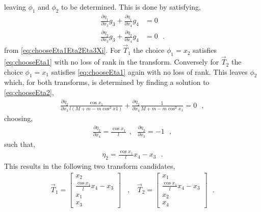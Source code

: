 leaving $\phi_1$ and $\phi_2$ to be determined. This is done by satisfying,
\begin{align}
\frac{\partial \eta_1}{\partial x_3} g_3 + \frac{\partial \eta_1}{\partial x_4} g_4 &= 0       \label{eq:chooseEta1}  \\
\frac{\partial \eta_2}{\partial x_3} g_3 + \frac{\partial \eta_2}{\partial x_4} g_4 &= 0       \label{eq:chooseEta2}  
\ \ \ .
\end{align}
from \autoref{eq:chooseEta1Eta2Eta3Xi}. For $\vec{T}_1$ the choice $\phi_1 = x_2$ satisfies \autoref{eq:chooseEta1} with no loss of rank in the transform. Conversely for $\vec{T}_2$ the choice $\phi_1 = x_1$ satisfies \autoref{eq:chooseEta1} again with no loss of rank. This leaves $\phi_2$ which, for both transforms, is determined by finding a solution to \autoref{eq:chooseEta2},
\begin{align}
 \frac{\partial \eta_2}{\partial x_3} \frac{\cos x_1}{l (M + m - m \cos^2 x1)} + \frac{\partial \eta_2}{\partial x_4} \frac{1}{M + m - m \cos^2 x_1 } = 0 \ \ \ ,
\end{align}
choosing,
\begin{align}
\frac{\partial \eta_2}{\partial x_4} = \frac{\cos x_1}{l}  \ \ , \ \ \ \frac{\partial \eta_2}{\partial x_3}  = -1 \ \ \ ,
\end{align}
such that,
\begin{align}
\eta_2 =  \frac{\cos x_1}{l} x_4 - x_3 \ \ \ .
\end{align}
%
This results in the following two transform candidates,
\begin{align}
\vec{T}_1 =
\begin{bmatrix}
x_2   \\
\frac{\cos x_1}{l} x_4 - x_3  \\
x_1   \\
x_3
\end{bmatrix} \ \ \ \ , \ \ \ \
\vec{T}_2
=
\begin{bmatrix}
x_1   \\
\frac{\cos x_1}{l} x_4 - x_3   \\
x_2   \\
x_4
\end{bmatrix} \ \ \ .
\end{align}
